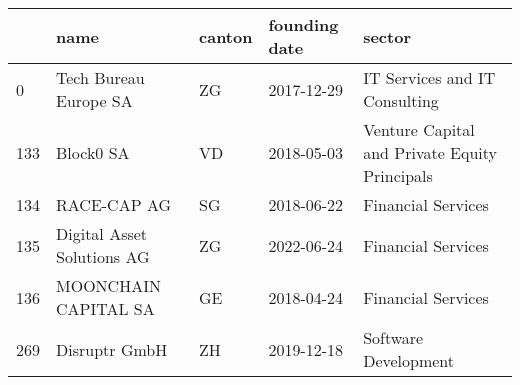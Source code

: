\begin{tabular}{lllll}
\toprule
{} &                        name & canton & founding date &                                         sector \\
\midrule
0   &       Tech Bureau Europe SA &     ZG &    2017-12-29 &                  IT Services and IT Consulting \\
133 &                   Block0 SA &     VD &    2018-05-03 &  Venture Capital and Private Equity Principals \\
134 &                 RACE-CAP AG &     SG &    2018-06-22 &                             Financial Services \\
135 &  Digital Asset Solutions AG &     ZG &    2022-06-24 &                             Financial Services \\
136 &        MOONCHAIN CAPITAL SA &     GE &    2018-04-24 &                             Financial Services \\
269 &               Disruptr GmbH &     ZH &    2019-12-18 &                           Software Development \\
\bottomrule
\end{tabular}
